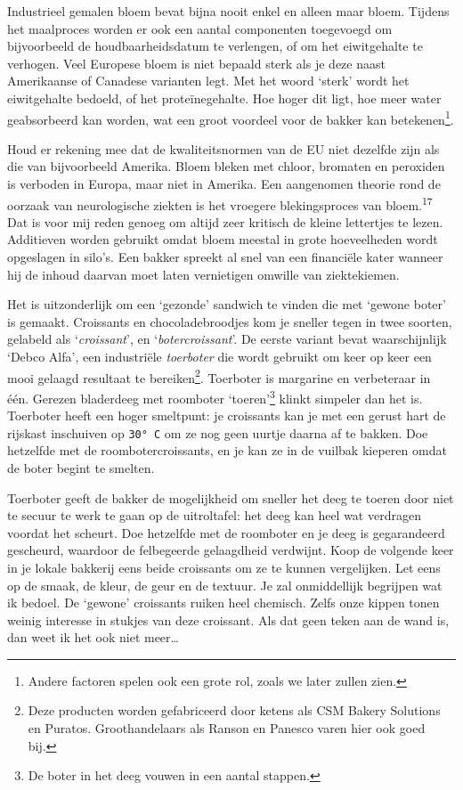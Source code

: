 \documentclass[
  11pt,
  dutch,
]{memoir}
\begin{document}
Industrieel gemalen bloem bevat bijna nooit enkel en alleen maar bloem.
Tijdens het maalproces worden er ook een aantal componenten toegevoegd
om bijvoorbeeld de houdbaarheidsdatum te verlengen, of om het
eiwitgehalte te verhogen. Veel Europese bloem is niet bepaald sterk als
je deze naast Amerikaanse of Canadese varianten legt. Met het woord
`sterk' wordt het eiwitgehalte bedoeld, of het proteïnegehalte. Hoe
hoger dit ligt, hoe meer water geabsorbeerd kan worden, wat een groot
voordeel voor de bakker kan betekenen\footnote{Andere factoren spelen
  ook een grote rol, zoals we later zullen zien.}.

Houd er rekening mee dat de kwaliteitsnormen van de EU niet dezelfde
zijn als die van bijvoorbeeld Amerika. Bloem bleken met chloor, bromaten
en peroxiden is verboden in Europa, maar niet in Amerika. Een aangenomen
theorie rond de oorzaak van neurologische ziekten is het vroegere
blekingsproces van bloem.\textsuperscript{17} Dat is voor mij reden
genoeg om altijd zeer kritisch de kleine lettertjes te lezen. Additieven
worden gebruikt omdat bloem meestal in grote hoeveelheden wordt
opgeslagen in silo's. Een bakker spreekt al snel van een financiële
kater wanneer hij de inhoud daarvan moet laten vernietigen omwille van
ziektekiemen.

Het is uitzonderlijk om een `gezonde' sandwich te vinden die met `gewone
boter' is gemaakt. Croissants en chocoladebroodjes kom je sneller tegen
in twee soorten, gelabeld als `\emph{croissant}', en
`\emph{botercroissant}'. De eerste variant bevat waarschijnlijk `Debco
Alfa', een industriële \emph{toerboter} die wordt gebruikt om keer op
keer een mooi gelaagd resultaat te bereiken\footnote{Deze producten
  worden gefabriceerd door ketens als CSM Bakery Solutions en Puratos.
  Groothandelaars als Ranson en Panesco varen hier ook goed bij.}.
Toerboter is margarine en verbeteraar in één. Gerezen bladerdeeg met
roomboter `toeren'\footnote{De boter in het deeg vouwen in een aantal
  stappen.} klinkt simpeler dan het is. Toerboter heeft een hoger
smeltpunt: je croissants kan je met een gerust hart de rijskast
inschuiven op \texttt{30°\ C} om ze nog geen uurtje daarna af te bakken.
Doe hetzelfde met de roombotercroissants, en je kan ze in de vuilbak
kieperen omdat de boter begint te smelten.

Toerboter geeft de bakker de mogelijkheid om sneller het deeg te toeren
door niet te secuur te werk te gaan op de uitroltafel: het deeg kan heel
wat verdragen voordat het scheurt. Doe hetzelfde met de roomboter en je
deeg is gegarandeerd gescheurd, waardoor de felbegeerde gelaagdheid
verdwijnt. Koop de volgende keer in je lokale bakkerij eens beide
croissants om ze te kunnen vergelijken. Let eens op de smaak, de kleur,
de geur en de textuur. Je zal onmiddellijk begrijpen wat ik bedoel. De
`gewone' croissants ruiken heel chemisch. Zelfs onze kippen tonen weinig
interesse in stukjes van deze croissant. Als dat geen teken aan de wand
is, dan weet ik het ook niet meer\ldots{}
\end{document}
